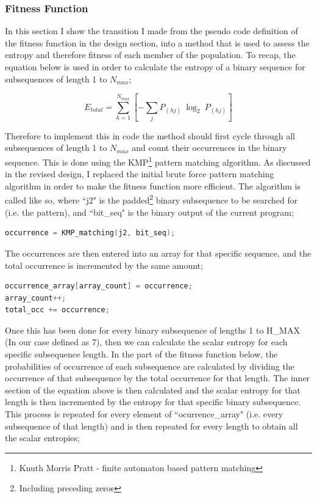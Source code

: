 \documentclass[a4paper,10.5pt]{article}
\begin{document}
\subsubsection{Fitness Function}
In this section I show the transition I made from the pseudo code definition of the fitness function in the design section, into a method that is used to assess the entropy and therefore fitness of each member of the population. To recap, the equation below is used in order to calculate the entropy of a binary sequence for subsequences of length 1 to $N_{max}$;

\begin{equation*}
E_{total} = \sum_{h = 1}^{N_{max}} \left[ - \sum_{j} P_{(hj)}\ \log_2\ P_{(hj)} \right]
\end{equation*}

Therefore to implement this in code the method should first cycle through all subsequences of length 1 to $N_{max}$ and count their occurrences in the binary sequence. This is done using the KMP\footnote{Knuth Morris Pratt - finite automaton based pattern matching} pattern matching algorithm. As discussed in the revised design, I replaced the initial brute force pattern matching algorithm in order to make the fitness function more efficient. The algorithm is called like so, where ``j2" is the padded\footnote{Including preceding zeros} binary subsequence to be searched for (i.e. the pattern), and ``bit\_seq" is the binary output of the current program;
\begin{lstlisting}[language=C]
occurrence = KMP_matching(j2, bit_seq);
\end{lstlisting}

The occurrences are then entered into an array for that specific sequence, and the total occurrence is incremented by the same amount;
\begin{lstlisting}[language=C]
occurrence_array[array_count] = occurrence;
array_count++;
total_occ += occurrence;
\end{lstlisting}

Once this has been done for every binary subsequence of lengths 1 to H\_MAX (In our case defined as 7), then we can calculate the scalar entropy for each specific subsequence length. In the part of the fitness function below, the probabilities of occurrence of each subsequence are calculated by dividing the occurrence of that subsequence by the total occurrence for that length. The inner section of the equation above is then calculated and the scalar entropy for that length is then incremented by the entropy for that specific binary subsequence. This process is repeated for every element of ``ocurrence\_array" (i.e. every subsequence of that length) and is then repeated for every length to obtain all the scalar entropies;
\end{document}
